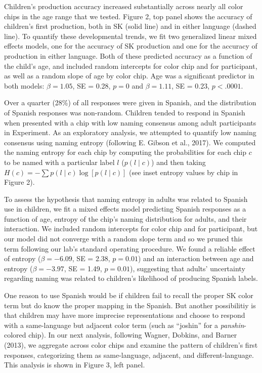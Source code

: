 \documentclass[,man,floatsintext]{apa6}
\theoremstyle{definition}
\theoremstyle{definition}
\theoremstyle{definition}
\theoremstyle{remark}
\begin{document}
Children's production accuracy increased substantially across nearly all
color chips in the age range that we tested. Figure 2, top panel shows
the accuracy of children's first production, both in SK (solid line) and
in either language (dashed line). To quantify these developmental
trends, we fit two generalized linear mixed effects models, one for the
accuracy of SK production and one for the accuracy of production in
either language. Both of these predicted accuracy as a function of the
child's age, and included random intercepts for color chip and for
participant, as well as a random slope of age by color chip. Age was a
significant predictor in both models: \(\beta = 1.05\), SE = 0.28,
\(p = 0\) and \(\beta = 1.11\), SE = 0.23, \(p < .0001\).

Over a quarter (28\%) of all responses were given in Spanish, and the
distribution of Spanish responses was non-random. Children tended to
respond in Spanish when presented with a chip with low naming consensus
among adult participants in Experiment. As an exploratory analysis, we
attempted to quantify low naming consensus using naming entropy
(following E. Gibson et al., 2017). We computed the naming entropy for
each chip by computing the probabilities for each chip \(c\) to be named
with a particular label \(l\) (\(p(l \mid c)\)) and then taking
\(H(c) = - \sum{p(l\mid c) \log[p(l \mid c)]}\) (see inset entropy
values by chip in Figure 2).

To assess the hypothesis that naming entropy in adults was related to
Spanish use in children, we fit a mixed effects model predicting Spanish
responses as a function of age, entropy of the chip's naming
distribution for adults, and their interaction. We included random
intercepts for color chip and for participant, but our model did not
converge with a random slope term and so we pruned this term following
our lab's standard operating procedure. We found a reliable effect of
entropy (\(\beta = -6.09\), SE = 2.38, \(p = 0.01\)) and an interaction
between age and entropy (\(\beta = -3.97\), SE = 1.49, \(p = 0.01\)),
suggesting that adults' uncertainty regarding naming was related to
children's likelihood of producing Spanish labels.

One reason to use Spanish would be if children fail to recall the proper
SK color term but do know the proper mapping in the Spanish. But another
possibilitiy is that children may have more imprecise representations
and choose to respond with a same-language but adjacent color term (such
as \enquote{joshin} for a \emph{panshin}-colored chip). In our next
analysis, following Wagner, Dobkins, and Barner (2013), we aggregate
across color chips and examine the pattern of children's first
responses, categorizing them as same-language, adjacent, and
different-language. This analysis is shown in Figure 3, left panel.
\end{document}
